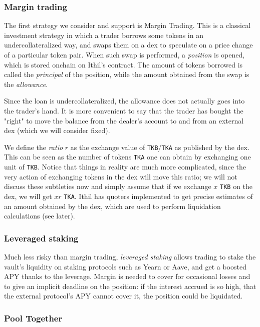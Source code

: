 \documentclass[a4paper,10 pt]{article}
\theoremstyle{definition}
\begin{document}
\subsubsection{Margin trading}

The first strategy we consider and support is Margin Trading. This is a classical investment strategy in which a trader borrows some tokens in an undercollateralized way, and swaps them on a dex to speculate on a price change of a particular token pair. When such swap is performed, a {\it position} is opened, which is stored onchain on Ithil's contract. The amount of tokens borrowed is called the {\it principal} of the position, while the amount obtained from the swap is the {\it allowance}.

Since the loan is undercollateralized, the allowance does not actually goes into the trader's hand. It is more convenient to say that the trader has bought the "right" to move the balance from the dealer's account to and from an external dex (which we will consider fixed).

We define the {\it ratio} $r$ as the exchange value of \verb|TKB|/\verb|TKA| as published by the dex. This can be seen as the number of tokens \verb|TKA| one can obtain by exchanging one unit of \verb|TKB|. Notice that things in reality are much more complicated, since the very action of exchanging tokens in the dex will move this ratio; we will not discuss these subtleties now and simply assume that if we exchange $x$ \verb|TKB| on the dex, we will get $xr$ \verb|TKA|. Ithil has quoters implemented to get precise estimates of an amount obtained by the dex, which are used to perform liquidation calculations (see later).

\subsubsection{Leveraged staking}

Much less risky than margin trading, {\it leveraged staking} allows trading to stake the vault's liquidity on staking protocols such as Yearn or Aave, and get a boosted APY thanks to the leverage. Margin is needed to cover for occasional losses and to give an implicit deadline on the position: if the interest accrued is so high, that the external protocol's APY cannot cover it, the position could be liquidated.

\subsubsection{Pool Together}
\end{document}
